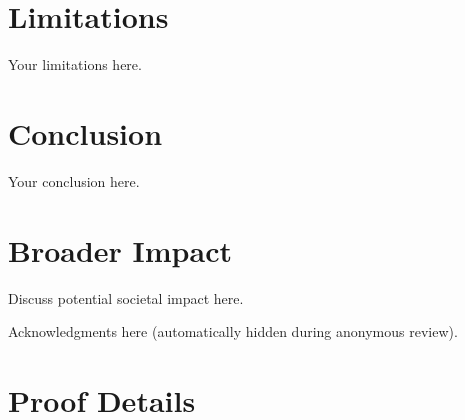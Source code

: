 \documentclass{article}
\begin{document}

\section{Limitations}

Your limitations here.

\section{Conclusion}

Your conclusion here.

\section*{Broader Impact}

Discuss potential societal impact here.

\begin{ack}
Acknowledgments here (automatically hidden during anonymous review).
\end{ack}




\newpage
\appendix

\section{Proof Details}
\end{document}
